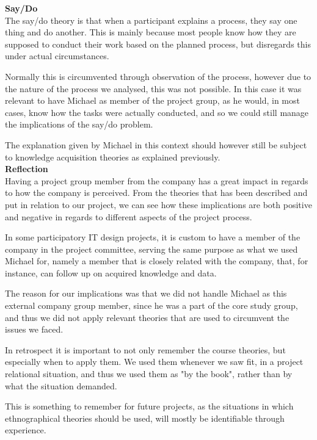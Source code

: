 \textbf{Say/Do}\\

The say/do theory is that when a participant explains a process, they say one thing and do another. This is mainly because most people know how they are supposed to conduct their work based on the planned process, but disregards this under actual circumstances.

Normally this is circumvented through observation of the process, however due to the nature of the process we analysed, this was not possible. In this case it was relevant to have Michael as member of the project group, as he would, in most cases, know how the tasks were actually conducted, and so we could still manage the implications of the say/do problem.

The explanation given by Michael in this context should however still be subject to knowledge acquisition theories as explained previously.
\\

\textbf{Reflection}\\

Having a project group member from the company has a great impact in regards to how the company is perceived. From the theories that has been described and put in relation to our project, we can see how these implications are both positive and negative in regards to different aspects of the project process.

In some participatory IT design projects, it is custom to have a member of the company in the project committee, serving the same purpose as what we used Michael for, namely a member that is closely related with the company, that, for instance, can follow up on acquired knowledge and data.

The reason for our implications was that we did not handle Michael as this external company group member, since he was a part of the core study group, and thus we did not apply relevant theories that are used to circumvent the issues we faced.

In retrospect it is important to not only remember the course theories, but especially when to apply them. We used them whenever we saw fit, in a project relational situation, and thus we used them as "by the book", rather than by what the situation demanded.

This is something to remember for future projects, as the situations in which ethnographical theories should be used, will mostly be identifiable through experience.
\\

